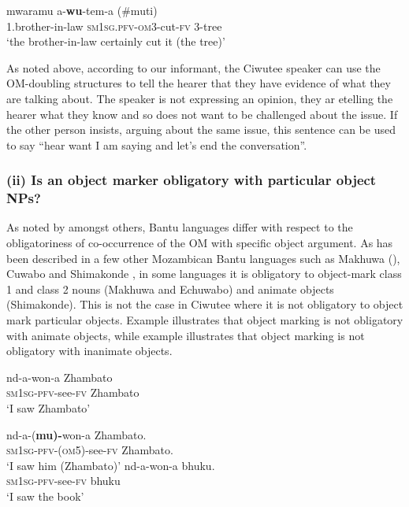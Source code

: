 \documentclass[output=paper]{langscibook}
\begin{document}
\ex\label{ex:ngunga:42b} \gll   mwaramu    a-\textbf{wu}{}-tem-a    (\#muti)\\
     1.brother-in-law  {\textsc{sm1sg}.\textsc{pfv}-\textsc{om}3}{}-cut-{\textsc{fv}}  3-tree\\
\glt       ‘the brother-in-law certainly cut it (the tree)’ 
    \z
\z

As noted above, according to our informant, the Ciwutee speaker can use the OM-doubling structures to tell the hearer that they have evidence of what they are talking about. The speaker is not expressing an opinion, they ar etelling the hearer what they know and so does not want to be challenged about the issue. If the other person insists, arguing about the same issue, this sentence can be used to say ``hear want I am saying and let’s end the conversation''. 

\subsubsection{(ii) Is an object marker obligatory with particular object NPs?}

As noted by \citet{MartenKula2012} amongst others, Bantu languages differ with respect to the obligatoriness of co-occurrence of the OM with specific object argument. As has been described in a few other Mozambican Bantu languages such as Makhuwa (\citealt{vanderWal2015}), Cuwabo \citep{Guérois2015} and Shimakonde \citep{NgungaEtAl2016}, in some languages it is obligatory to object-mark class 1 and class 2 nouns (Makhuwa and Echuwabo) and animate objects (Shimakonde). This is not the case in Ciwutee where it is not obligatory to object mark particular objects. Example  illustrates that object marking is not obligatory with animate objects, while example  illustrates that object marking is not obligatory with inanimate objects. 

\ea\label{ex:ngunga:43}
\ea\label{ex:ngunga:43a} \gll nd-a-won-a    Zhambato\\
{\textsc{sm1sg}-\textsc{pfv}}{}-see-\textsc{fv}    Zhambato\\
\glt ‘I saw Zhambato’  

\ex\label{ex:ngunga:43b} \gll  nd-a-(\textbf{mu)-}won-a  Zhambato.\\
{\textsc{sm1sg}-\textsc{pfv}}{}-(\textsc{om5})-see-\textsc{fv}    Zhambato.\\
\glt ‘I saw him (Zhambato)’
    \z
\ex\label{ex:ngunga:44}
\ea\label{ex:ngunga:44a} \gll nd-a-won-a    bhuku.\\
{\textsc{sm1sg}-\textsc{pfv}}{}-see-\textsc{fv}    bhuku\\
\glt ‘I saw the book’  
\end{document}
